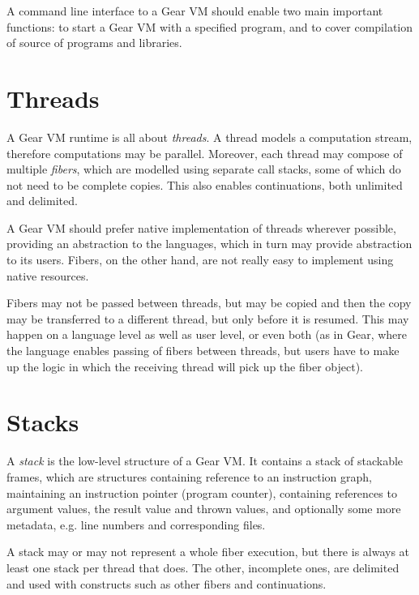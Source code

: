 A command line interface to a Gear VM should enable two main important functions: to start a Gear VM with a specified program, and to cover compilation of source of programs and libraries. 






\section{Threads}

A Gear VM runtime is all about {\em threads}. A thread models a computation stream, therefore computations may be parallel. Moreover, each thread may compose of multiple {\em fibers}, which are modelled using separate call stacks, some of which do not need to be complete copies. This also enables continuations, both unlimited and delimited. 

A Gear VM should prefer native implementation of threads wherever possible, providing an abstraction to the languages, which in turn may provide abstraction to its users. Fibers, on the other hand, are not really easy to implement using native resources. 

Fibers may not be passed between threads, but may be copied and then the copy may be transferred to a different thread, but only before it is resumed. This may happen on a language level as well as user level, or even both (as in Gear, where the language enables passing of fibers between threads, but users have to make up the logic in which the receiving thread will pick up the fiber object). 





\section{Stacks}

A {\em stack} is the low-level structure of a Gear VM. It contains a stack of stackable frames, which are structures containing reference to an instruction graph, maintaining an instruction pointer (program counter), containing references to argument values, the result value and thrown values, and optionally some more metadata, e.g. line numbers and corresponding files. 

A stack may or may not represent a whole fiber execution, but there is always at least one stack per thread that does. The other, incomplete ones, are delimited and used with constructs such as other fibers and continuations. 

